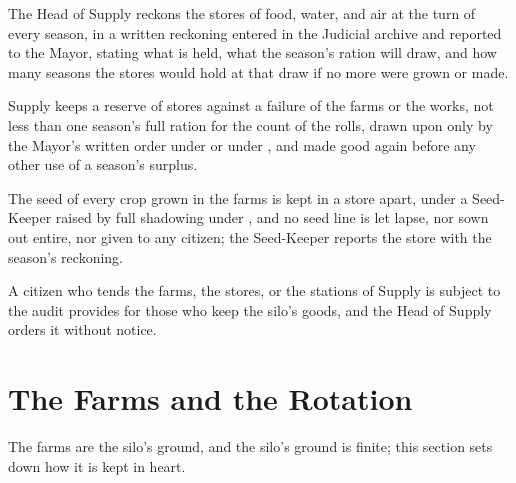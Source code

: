 \begin{clauses}
\item The Head of Supply reckons the stores of food, water, and air at the turn of every season, in a written reckoning entered in the Judicial archive and reported to the Mayor, stating what is held, what the season's ration will draw, and how many seasons the stores would hold at that draw if no more were grown or made.
\item Supply keeps a reserve of stores against a failure of the farms or the works, not less than one season's full ration for the count of the rolls, drawn upon only by the Mayor's written order under  or under , and made good again before any other use of a season's surplus.
\item The seed of every crop grown in the farms is kept in a store apart, under a Seed-Keeper raised by full shadowing under , and no seed line is let lapse, nor sown out entire, nor given to any citizen; the Seed-Keeper reports the store with the season's reckoning.
\item A citizen who tends the farms, the stores, or the stations of Supply is subject to the audit  provides for those who keep the silo's goods, and the Head of Supply orders it without notice.
\end{clauses}

\section{The Farms and the Rotation}
\label{sec:supply:farms-and-the-rotation}

The farms are the silo's ground, and the silo's ground is finite; this section sets down how it is kept in heart.


